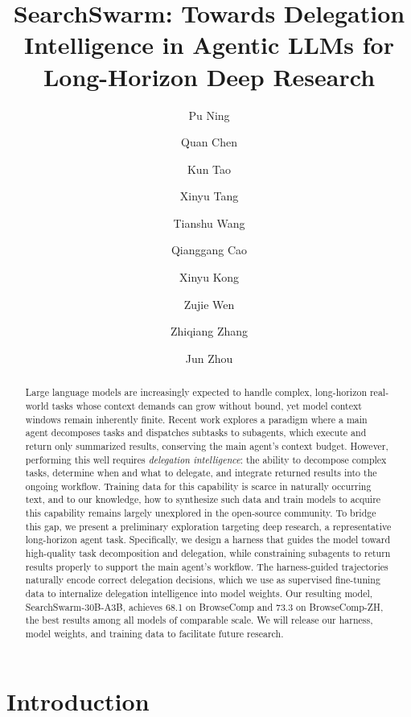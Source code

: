 \documentclass{llmxive}
\title{SearchSwarm: Towards Delegation Intelligence in Agentic LLMs for Long-Horizon Deep Research}
\author{Pu Ning \and Quan Chen \and Kun Tao \and Xinyu Tang \and Tianshu Wang \and Qianggang Cao \and Xinyu Kong \and Zujie Wen \and Zhiqiang Zhang \and Jun Zhou}
\begin{document}
\maketitle
\begin{abstract}
\fontsize{11pt}{12pt}\selectfont
Large language models are increasingly expected to handle complex, long-horizon real-world tasks whose context demands can grow without bound, yet model context windows remain inherently finite. Recent work explores a paradigm where a main agent decomposes tasks and dispatches subtasks to subagents, which execute and return only summarized results, conserving the main agent's context budget. However, performing this well requires \emph{delegation intelligence}: the ability to decompose complex tasks, determine when and what to delegate, and integrate returned results into the ongoing workflow. Training data for this capability is scarce in naturally occurring text, and to our knowledge, how to synthesize such data and train models to acquire this capability remains largely unexplored in the open-source community. To bridge this gap, we present a preliminary exploration targeting deep research, a representative long-horizon agent task. Specifically, we design a harness that guides the model toward high-quality task decomposition and delegation, while constraining subagents to return results properly to support the main agent's workflow. The harness-guided trajectories naturally encode correct delegation decisions, which we use as supervised fine-tuning data to internalize delegation intelligence into model weights. Our resulting model, SearchSwarm-30B-A3B, achieves 68.1 on BrowseComp and 73.3 on BrowseComp-ZH, the best results among all models of comparable scale. We will release our harness, model weights, and training data to facilitate future research.
\end{abstract}
\section{Introduction}
\label{sec:intro}
\end{document}
